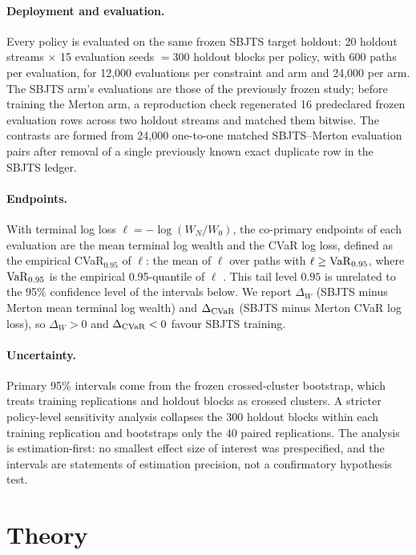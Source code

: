 \documentclass[11pt]{article}
\begin{document}
\paragraph{Deployment and evaluation.} Every policy is evaluated on the same frozen SBJTS target holdout: 20 holdout streams $\times$ 15 evaluation seeds $=300$ holdout blocks per policy, with 600 paths per evaluation, for 12,000 evaluations per constraint and arm and 24,000 per arm. The SBJTS arm's evaluations are those of the previously frozen study; before training the Merton arm, a reproduction check regenerated 16 predeclared frozen evaluation rows across two holdout streams and matched them bitwise. The contrasts are formed from 24,000 one-to-one matched SBJTS--Merton evaluation pairs after removal of a single previously known exact duplicate row in the SBJTS ledger.

\paragraph{Endpoints.} With terminal log loss $\ell=-\log(W_N/W_0)$, the co-primary endpoints of each evaluation are the mean terminal log wealth and the CVaR log loss, defined as the empirical CVaR$_{0.95}$ of $\ell$: the mean of $\ell$ over paths with $\ell\ge{\rm VaR}_{0.95}$, where ${\rm VaR}_{0.95}$ is the empirical 0.95-quantile of $\ell$ \cite{RockafellarUryasev2000}. This tail level $0.95$ is unrelated to the 95\% confidence level of the intervals below. We report $\Delta_W$ (SBJTS minus Merton mean terminal log wealth) and $\Delta_{\rm CVaR}$ (SBJTS minus Merton CVaR log loss), so $\Delta_W>0$ and $\Delta_{\rm CVaR}<0$ favour SBJTS training.

\paragraph{Uncertainty.} Primary 95\% intervals come from the frozen crossed-cluster bootstrap, which treats training replications and holdout blocks as crossed clusters. A stricter policy-level sensitivity analysis collapses the 300 holdout blocks within each training replication and bootstraps only the 40 paired replications. The analysis is estimation-first: no smallest effect size of interest was prespecified, and the intervals are statements of estimation precision, not a confirmatory hypothesis test.

\section{Theory}\label{sec:theory}
\end{document}
